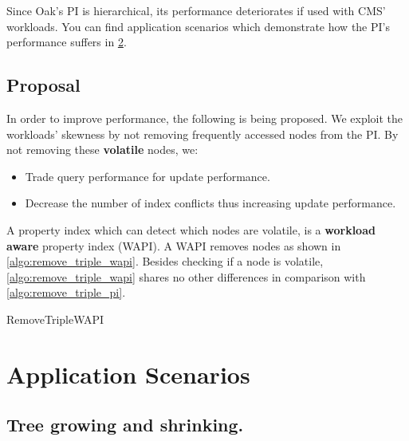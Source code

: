 \documentclass[abstracton,12pt]{scrreprt}
\begin{document}
Since Oak's PI is hierarchical, its performance deteriorates if used with CMS' workloads.
You can find application scenarios which demonstrate how the PI's performance suffers in \cref{sec:application_scenarios}.

\section{Proposal}

In order to improve performance, the following is being proposed.
We exploit the workloads' skewness by not removing frequently accessed nodes from the PI.
By not removing these \textbf{volatile} nodes, we:
\begin{itemize}
    \item Trade query performance for update performance.
    \item Decrease the number of index conflicts thus increasing update performance.
\end{itemize}
A property index which can detect which nodes are volatile, is a \textbf{workload aware} property index (WAPI).
A WAPI removes nodes as shown in \cref{algo:remove_triple_wapi}.
Besides checking if a node is volatile, \cref{algo:remove_triple_wapi} shares no other differences in comparison with \cref{algo:remove_triple_pi}.

\begin{algorithm}
    \label{algo:remove_triple_wapi}
    \caption{RemoveTripleWAPI}
    \DontPrintSemicolon
    \begin{footnotesize}
    \end{footnotesize}
\end{algorithm}

\chapter{Application Scenarios}
\label{sec:application_scenarios}
\section{Tree growing and shrinking.}
\end{document}
